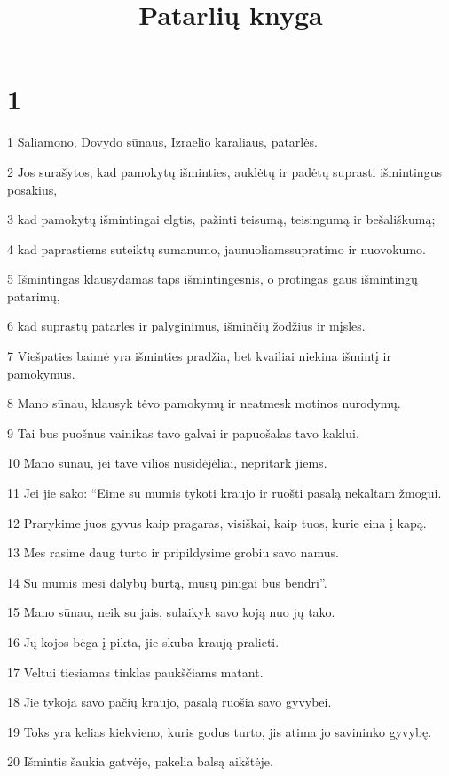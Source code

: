 

\title{Patarlių knyga}

\chapter{1}


\par 1 Saliamono, Dovydo sūnaus, Izraelio karaliaus, patarlės. 
\par 2 Jos surašytos, kad pamokytų išminties, auklėtų ir padėtų suprasti išmintingus posakius, 
\par 3 kad pamokytų išmintingai elgtis, pažinti teisumą, teisingumą ir bešališkumą; 
\par 4 kad paprastiems suteiktų sumanumo, jaunuoliams­supratimo ir nuovokumo. 
\par 5 Išmintingas klausydamas taps išmintingesnis, o protingas gaus išmintingų patarimų, 
\par 6 kad suprastų patarles ir palyginimus, išminčių žodžius ir mįsles. 
\par 7 Viešpaties baimė yra išminties pradžia, bet kvailiai niekina išmintį ir pamokymus. 
\par 8 Mano sūnau, klausyk tėvo pamokymų ir neatmesk motinos nurodymų. 
\par 9 Tai bus puošnus vainikas tavo galvai ir papuošalas tavo kaklui. 
\par 10 Mano sūnau, jei tave vilios nusidėjėliai, nepritark jiems. 
\par 11 Jei jie sako: “Eime su mumis tykoti kraujo ir ruošti pasalą nekaltam žmogui. 
\par 12 Prarykime juos gyvus kaip pragaras, visiškai, kaip tuos, kurie eina į kapą. 
\par 13 Mes rasime daug turto ir pripildysime grobiu savo namus. 
\par 14 Su mumis mesi dalybų burtą, mūsų pinigai bus bendri”. 
\par 15 Mano sūnau, neik su jais, sulaikyk savo koją nuo jų tako. 
\par 16 Jų kojos bėga į pikta, jie skuba kraują pralieti. 
\par 17 Veltui tiesiamas tinklas paukščiams matant. 
\par 18 Jie tykoja savo pačių kraujo, pasalą ruošia savo gyvybei. 
\par 19 Toks yra kelias kiekvieno, kuris godus turto, jis atima jo savininko gyvybę. 
\par 20 Išmintis šaukia gatvėje, pakelia balsą aikštėje. 
